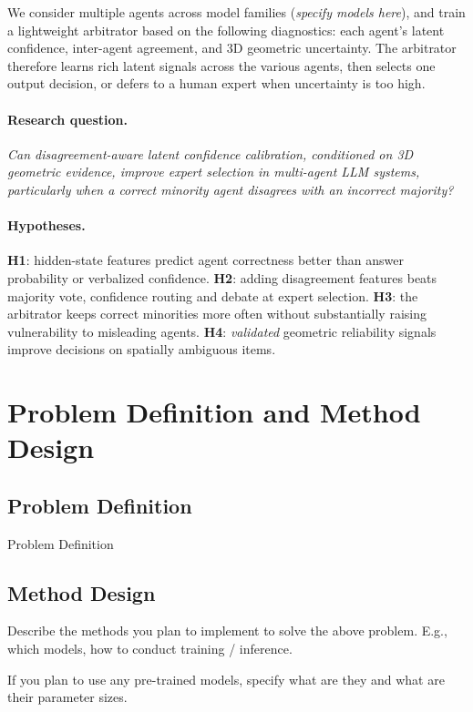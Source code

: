 \documentclass[11pt]{article}
\begin{document}
We consider multiple agents across model families (\textit{specify models here}), and train a lightweight arbitrator based on the following diagnostics: each agent's latent confidence, inter-agent agreement, and 3D geometric uncertainty. The arbitrator therefore learns rich latent signals across the various agents, then selects one output decision, or defers to a human expert when uncertainty is too high.

\paragraph{Research question.} \emph{Can disagreement-aware latent confidence calibration, conditioned on 3D geometric evidence, improve expert selection in multi-agent LLM systems, particularly when a correct minority agent disagrees with an incorrect majority?}

\paragraph{Hypotheses.} \textbf{H1}: hidden-state features predict agent correctness better than answer probability or verbalized confidence. \textbf{H2}: adding disagreement features beats majority vote, confidence routing and debate at expert selection. \textbf{H3}: the arbitrator keeps correct minorities more often without substantially raising vulnerability to misleading agents. \textbf{H4}: \emph{validated} geometric reliability signals improve decisions on spatially ambiguous items.

\section{Problem Definition and Method Design}

\subsection{Problem Definition}
Problem Definition

\subsection{Method Design}
Describe the methods you plan to implement to solve the above problem. E.g., which models, how to conduct training / inference.

If you plan to use any pre-trained models, specify what are they and what are their parameter sizes.
\end{document}
